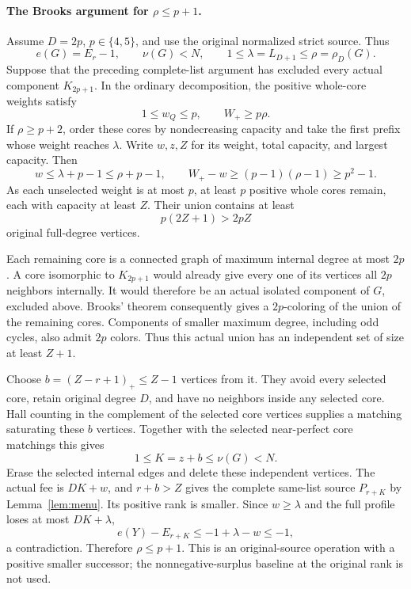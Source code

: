 \documentclass[11pt,a4paper]{article}
\theoremstyle{definition}
\begin{document}
\paragraph{The Brooks argument for \(\rho\le p+1\).}
Assume \(D=2p\), \(p\in\{4,5\}\), and use the original normalized strict
source.  Thus
\[
 e(G)=E_r-1,\qquad \nu(G)<N,\qquad
 1\le\lambda=L_{D+1}\le\rho=\rho_D(G).
\]
Suppose that the preceding complete-list argument has excluded every
actual component \(K_{2p+1}\).  In the ordinary decomposition, the
positive whole-core weights satisfy
\[
 1\le w_Q\le p,\qquad W_+\ge p\rho.
\]
If \(\rho\ge p+2\), order these cores by nondecreasing capacity and take
the first prefix whose weight reaches \(\lambda\).  Write \(w,z,Z\)
for its weight, total capacity, and largest capacity.  Then
\[
 w\le\lambda+p-1\le\rho+p-1,\qquad
 W_+-w\ge(p-1)(\rho-1)\ge p^2-1.
\]
As each unselected weight is at most \(p\), at least \(p\) positive
whole cores remain, each with capacity at least \(Z\).  Their union
contains at least
\[
 p(2Z+1)>2pZ
\]
original full-degree vertices.

Each remaining core is a connected graph of maximum internal degree
at most \(2p\).  A core isomorphic to \(K_{2p+1}\) would already give
every one of its vertices all \(2p\) neighbors internally.  It would
therefore be an actual isolated component of \(G\), excluded above.
Brooks' theorem consequently gives a \(2p\)-coloring of the union
of the remaining cores.  Components of smaller maximum degree,
including odd cycles, also admit \(2p\) colors.  Thus this actual union
has an independent set of size at least \(Z+1\).

Choose \(b=(Z-r+1)_+\le Z-1\) vertices from it.  They avoid every selected
core, retain original degree \(D\), and have no neighbors inside any
selected core.  Hall counting in the complement of the selected core
vertices supplies a matching saturating these \(b\) vertices.  Together
with the selected near-perfect core matchings this gives
\[
 1\le K=z+b\le\nu(G)<N.
\]
Erase the selected internal edges and delete these independent vertices.
The actual fee is \(DK+w\), and \(r+b>Z\) gives the complete same-list
source \(P_{r+K}\) by Lemma~\ref{lem:menu}.  Its positive rank is smaller.
Since \(w\ge\lambda\) and the full profile loses at most \(DK+\lambda\),
\[
 e(Y)-E_{r+K}\le-1+\lambda-w\le-1,
\]
a contradiction.  Therefore \(\rho\le p+1\).
This is an original-source operation with a positive smaller successor;
the nonnegative-surplus baseline at the original rank is not used.
\end{document}
